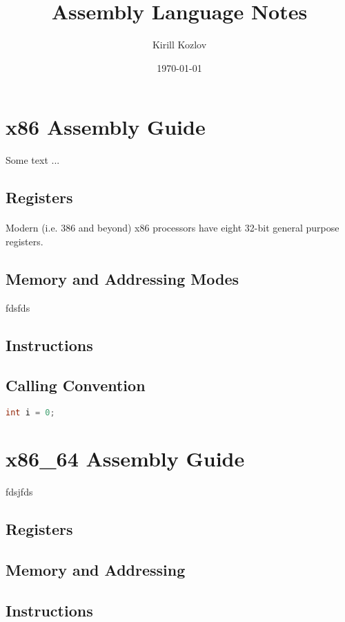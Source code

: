 \documentclass[a4paper,12pt]{article}
\begin{document}
\title{Assembly Language Notes}
\author{Kirill Kozlov}
\date{\today}
\maketitle

\section{x86 Assembly Guide}
Some text ... 
\subsection{Registers}
\paragraph{}
Modern (i.e. 386 and beyond) x86 processors have eight 32-bit general purpose registers.

\subsection{Memory and Addressing Modes}
fdsfds

\subsection{Instructions}

\subsection{Calling Convention}

\begin{lstlisting}[language=C]
int	i = 0;
\end{lstlisting}

\newpage
\section{x86\_64 Assembly Guide}
fdsjfds
\subsection{Registers}
\subsection{Memory and Addressing}
\subsection{Instructions}
\end{document}

